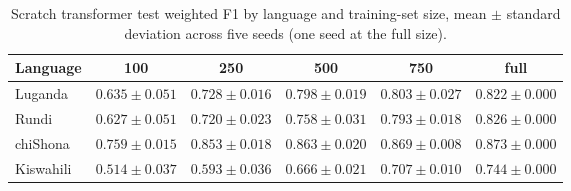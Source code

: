 \begin{table}[t]
\centering
\caption{Scratch transformer test weighted F1 by language and training-set size, mean $\pm$ standard deviation across five seeds (one seed at the full size).}
\label{tab:scratch_main_results}
\small
\begin{tabular}{lccccc}
\toprule
Language & 100 & 250 & 500 & 750 & full \\
\midrule
Luganda & $0.635 \pm 0.051$ & $0.728 \pm 0.016$ & $0.798 \pm 0.019$ & $0.803 \pm 0.027$ & $0.822 \pm 0.000$ \\
Rundi & $0.627 \pm 0.051$ & $0.720 \pm 0.023$ & $0.758 \pm 0.031$ & $0.793 \pm 0.018$ & $0.826 \pm 0.000$ \\
chiShona & $0.759 \pm 0.015$ & $0.853 \pm 0.018$ & $0.863 \pm 0.020$ & $0.869 \pm 0.008$ & $0.873 \pm 0.000$ \\
Kiswahili & $0.514 \pm 0.037$ & $0.593 \pm 0.036$ & $0.666 \pm 0.021$ & $0.707 \pm 0.010$ & $0.744 \pm 0.000$ \\
\bottomrule
\end{tabular}
\end{table}